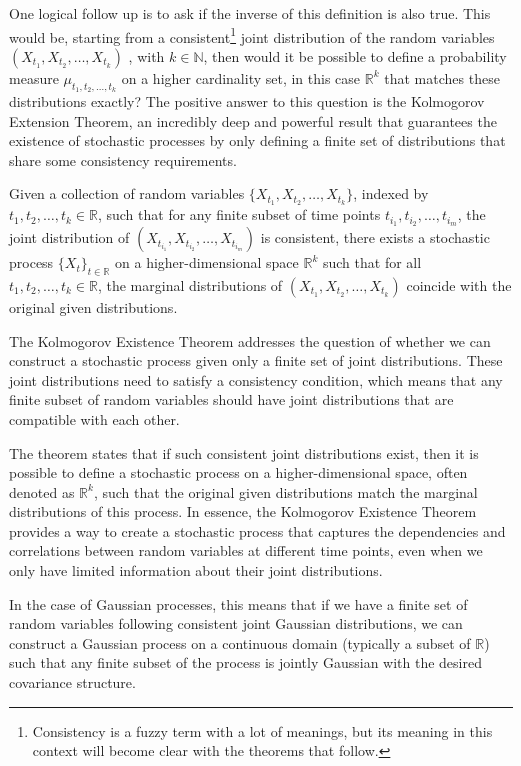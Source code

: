 One logical follow up is to ask if the inverse of this definition is also true. This would be, starting from a consistent\footnote{Consistency is a fuzzy term with a lot of meanings, but its meaning in this context will become clear with the theorems that follow.} joint distribution of the random variables $(X_{t_1}, X_{t_2}, \ldots, X_{t_k})$ , with $k \in \mathbb{N}$, then would it be possible to define a probability measure $\mu_{t_1, t_2, \ldots, t_k}$ on a higher cardinality set, in this case $\mathbb{R}^k$ that matches these distributions exactly? The positive answer to this question is the Kolmogorov Extension Theorem, an incredibly deep and powerful result that guarantees the existence of stochastic processes by only defining a finite set of distributions that share some consistency requirements. 

\begin{theorem}
	Given a collection of random variables $\{X_{t_1}, X_{t_2}, \ldots, X_{t_k}\}$, indexed by $t_1, t_2, \ldots, t_k \in \mathbb{R}$, such that for any finite subset of time points $t_{i_1}, t_{i_2}, \ldots, t_{i_m}$, the joint distribution of $(X_{t_{i_1}}, X_{t_{i_2}}, \ldots, X_{t_{i_m}})$ is consistent, there exists a stochastic process $\{X_t\}_{t \in \mathbb{R}}$ on a higher-dimensional space $\mathbb{R}^k$ such that for all $t_1, t_2, \ldots, t_k \in \mathbb{R}$, the marginal distributions of $(X_{t_1}, X_{t_2}, \ldots, X_{t_k})$ coincide with the original given distributions.
\end{theorem}

The Kolmogorov Existence Theorem addresses the question of whether we can construct a stochastic process given only a finite set of joint distributions. These joint distributions need to satisfy a consistency condition, which means that any finite subset of random variables should have joint distributions that are compatible with each other.

The theorem states that if such consistent joint distributions exist, then it is possible to define a stochastic process on a higher-dimensional space, often denoted as $\mathbb{R}^k$, such that the original given distributions match the marginal distributions of this process. In essence, the Kolmogorov Existence Theorem provides a way to create a stochastic process that captures the dependencies and correlations between random variables at different time points, even when we only have limited information about their joint distributions. 

In the case of Gaussian processes, this means that if we have a finite set of random variables following consistent joint Gaussian distributions, we can construct a Gaussian process on a continuous domain (typically a subset of $\mathbb{R}$) such that any finite subset of the process is jointly Gaussian with the desired covariance structure. 

